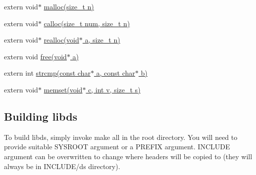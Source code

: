 \begin{DoxyItemize}
\item {\ttfamily extern void$\ast$ \hyperlink{__commons_8h_a407cb7c4124fb8d97e508ad0a8b0415c}{malloc(size\+\_\+t n)}}
\item {\ttfamily extern void$\ast$ \hyperlink{__commons_8h_a38e7ddae95f49135e25e2ce810388fbe}{calloc(size\+\_\+t num, size\+\_\+t n)}}
\item {\ttfamily extern void$\ast$ \hyperlink{__commons_8h_a2cbbe381cb9af0a2781dafafabed9e57}{realloc(void$\ast$ a, size\+\_\+t n)}}
\item {\ttfamily extern void \hyperlink{__commons_8h_a6c8971f363cd51e5b56e7d583a408567}{free(void$\ast$ a)}}
\item {\ttfamily extern int \hyperlink{__commons_8h_a14e6581584b7433c4440fdc7ecf86aea}{strcmp(const char$\ast$ a, const char$\ast$ b)}}
\item {\ttfamily extern void$\ast$ \hyperlink{__commons_8h_a02eae57b492a236cf29b6394f6385860}{memset(void$\ast$ c, int v, size\+\_\+t s)}}
\end{DoxyItemize}

\subsection*{Building libds}

To build libds, simply invoke {\ttfamily make all} in the root directory. You will need to provide suitable {\ttfamily S\+Y\+S\+R\+O\+O\+T} argument or a {\ttfamily P\+R\+E\+F\+I\+X} argument. {\ttfamily I\+N\+C\+L\+U\+D\+E} argument can be overwritten to change where headers will be copied to (they will always be in {\ttfamily I\+N\+C\+L\+U\+D\+E}/{\ttfamily ds} directory). 